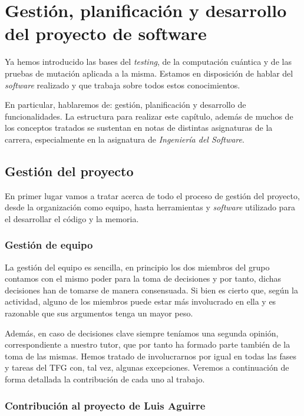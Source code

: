 \chapter[Gestión, planificación y desarrollo del software]{Gestión, planificación y desarrollo del proyecto de software}
Ya hemos introducido las bases del \textit{testing}, de la computación cuántica y de las pruebas de mutación aplicada a la misma. Estamos en disposición de hablar del \textit{software} realizado y que trabaja sobre todos estos conocimientos.

En particular, hablaremos de: gestión, planificación y desarrollo de funcionalidades. La estructura para realizar este capítulo, además de muchos de los conceptos tratados se sustentan en notas de distintas asignaturas de la carrera, especialmente en la asignatura de \textit{Ingeniería del Software}. 
\section{Gestión del proyecto}

En primer lugar vamos a tratar acerca de todo el proceso de gestión del proyecto, desde la organización como equipo, hasta herramientas y \textit{software} utilizado para el desarrollar el código y la memoria.

\subsection{Gestión de equipo}

La gestión del equipo es sencilla, en principio los dos miembros del grupo contamos con el mismo poder para la toma de decisiones y por tanto, dichas decisiones han de tomarse de manera consensuada. Si bien es cierto que, según la actividad, alguno de los miembros puede estar más involucrado en ella y es razonable que sus argumentos tenga un mayor peso.

Además, en caso de decisiones clave siempre teníamos una segunda opinión, correspondiente a nuestro tutor, que por tanto ha formado parte también de la toma de las mismas. Hemos tratado de involucrarnos por igual en todas las fases y tareas del TFG con, tal vez, algunas excepciones. Veremos a continuación de forma detallada la contribución de cada uno al trabajo.

\subsection{Contribución al proyecto de Luis Aguirre}


